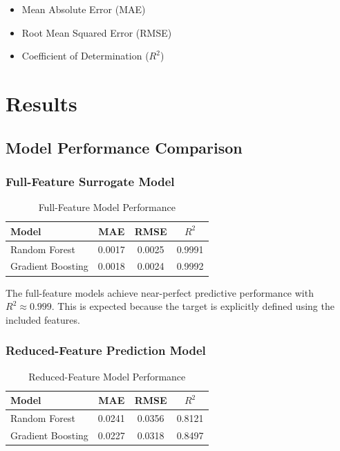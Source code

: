 \documentclass[11pt,a4paper]{article}
\begin{document}
\begin{itemize}
    \item Mean Absolute Error (MAE)
    \item Root Mean Squared Error (RMSE)
    \item Coefficient of Determination ($R^2$)
\end{itemize}

\newpage
\section{Results}

\subsection{Model Performance Comparison}

\subsubsection{Full-Feature Surrogate Model}

\begin{table}[h]
\centering
\caption{Full-Feature Model Performance}
\begin{tabular}{l c c c}
\toprule
Model & MAE & RMSE & $R^2$ \\
\midrule
Random Forest & 0.0017 & 0.0025 & 0.9991 \\
Gradient Boosting & 0.0018 & 0.0024 & 0.9992 \\
\bottomrule
\end{tabular}
\end{table}

The full-feature models achieve near-perfect predictive performance with $R^2 \approx 0.999$. This is expected because the target is explicitly defined using the included features.

\subsubsection{Reduced-Feature Prediction Model}

\begin{table}[h]
\centering
\caption{Reduced-Feature Model Performance}
\begin{tabular}{l c c c}
\toprule
Model & MAE & RMSE & $R^2$ \\
\midrule
Random Forest & 0.0241 & 0.0356 & 0.8121 \\
Gradient Boosting & 0.0227 & 0.0318 & 0.8497 \\
\bottomrule
\end{tabular}
\end{table}
\end{document}
